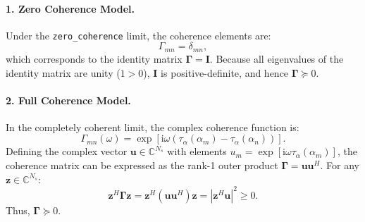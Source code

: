 \documentclass[11pt]{article}
\newcommand{\ii}{\mathrm{i}}
\newcommand{\vect}[1]{\bm{#1}}
\newcommand{\mat}[1]{\bm{#1}}
\begin{document}
\paragraph{1. Zero Coherence Model.}
Under the \texttt{zero\_coherence} limit, the coherence elements are:
\begin{equation*}
    \Gamma_{mn} = \delta_{mn},
\end{equation*}
which corresponds to the identity matrix $\mat{\Gamma} = \mat{I}$. Because all eigenvalues of the identity matrix are unity ($1 > 0$), $\mat{I}$ is positive-definite, and hence $\mat{\Gamma} \succeq 0$.

\paragraph{2. Full Coherence Model.}
In the completely coherent limit, the complex coherence function is:
\begin{equation*}
    \Gamma_{mn}(\omega) = \exp\left[ \ii \omega \left( \tau_\alpha(\alpha_m) - \tau_\alpha(\alpha_n) \right) \right].
\end{equation*}
Defining the complex vector $\vect{u} \in \mathbb{C}^{N_s}$ with elements $u_m = \exp\left[\ii \omega \tau_\alpha(\alpha_m)\right]$, the coherence matrix can be expressed as the rank-1 outer product $\mat{\Gamma} = \vect{u}\vect{u}^H$. For any $\vect{z} \in \mathbb{C}^{N_s}$:
\begin{equation*}
    \vect{z}^H \mat{\Gamma} \vect{z}
    =
    \vect{z}^H (\vect{u}\vect{u}^H) \vect{z}
    =
    \left| \vect{z}^H \vect{u} \right|^2 \ge 0.
\end{equation*}
Thus, $\mat{\Gamma} \succeq 0$.
\end{document}
